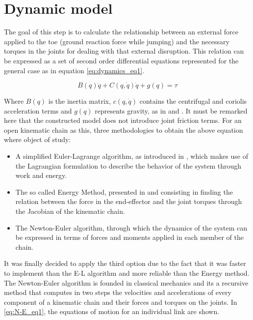 \section{Dynamic model}
\label{sec_dynamic_model}
The goal of this step is to calculate the relationship between an external force applied to the toe (ground reaction force while jumping) and the necessary torques in the joints for dealing with that external disruption.
This relation can be expressed as a set of second order differential equations represented for the general case as in equation \ref{eq:dynamics_eq1}. 

\begin{equation}
	\label{eq:dynamics_eq1}
	B(q)\ddot{q} + C(q,\dot{q})\dot{q} + g(q) = \tau
\end{equation}

Where $B(q)$ is the inertia matrix, $c(q,\dot{q})$ contains the centrifugal and coriolis acceleration terms and $g(q)$ represents gravity, as in \cite{dynamics1} and \cite{dynamics2}. 
It must be remarked here that the constructed model does not introduce joint friction terms.
For an open kinematic chain as this, three methodologies to obtain the above equation where object of study:

\begin{itemize}
	\item A simplified Euler-Lagrange algorithm, as introduced in \cite{E-L1}, which makes use of the Lagrangian formulation to describe the behavior of the system through work and energy.
	\item The so called Energy Method, presented in \cite{asada} and consisting in finding the relation between the force in the end-effector and the joint torques through the Jacobian of the kinematic chain.
	\item The Newton-Euler algorithm, through which the dynamics of the system can be expressed in terms of forces and moments applied in each member of the chain.
\end{itemize}

It was finally decided to apply the third option due to the fact that it was faster to implement than the E-L algorithm and more reliable than the Energy method.
The Newton-Euler algorithm is founded in classical mechanics and its a recursive method that computes in two steps the velocities and accelerations of every component of a kinematic chain and their forces and torques on the joints.
In \ref{eq:N-E_eq1}, the equations of motion for an individual link are shown.

